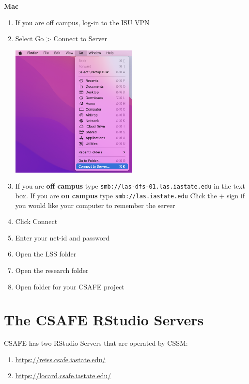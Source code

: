 \documentclass[
]{book}
\providecommand{\tightlist}{%
  \setlength{\itemsep}{0pt}\setlength{\parskip}{0pt}}
\begin{document}
\textbf{Mac}

\begin{enumerate}
\def\labelenumi{\arabic{enumi}.}
\tightlist
\item
  If you are off campus, log-in to the ISU VPN
\item
  Select Go \textgreater{} Connect to Server

  \includegraphics[width=0.5\textwidth,height=0.5\textheight]{images/connect_to_server.png}
\item
  If you are \textbf{off campus} type \texttt{smb://las-dfs-01.las.iastate.edu} in the text box. If you are \textbf{on campus} type \texttt{smb://las.iastate.edu} Click the + sign if you would like your computer to remember the server
\item
  Click Connect
\item
  Enter your net-id and password
\item
  Open the LSS folder
\item
  Open the research folder
\item
  Open folder for your CSAFE project
\end{enumerate}

\hypertarget{rstudio-server}{%
\chapter{The CSAFE RStudio Servers}\label{rstudio-server}}

CSAFE has two RStudio Servers that are operated by CSSM:

\begin{enumerate}
\def\labelenumi{\arabic{enumi}.}
\tightlist
\item
  \url{https://reiss.csafe.iastate.edu/}
\item
  \url{https://locard.csafe.iastate.edu/}
\end{enumerate}
\end{document}
